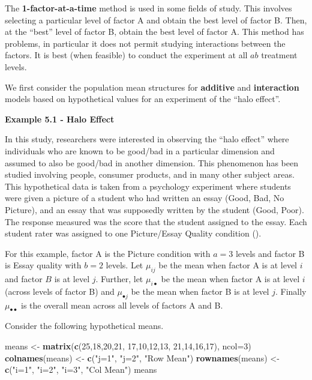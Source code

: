 \documentclass[
]{book}
\newenvironment{Shaded}{\begin{snugshade}}{\end{snugshade}}
\newcommand{\AttributeTok}[1]{\textcolor[rgb]{0.13,0.29,0.53}{#1}}
\newcommand{\DecValTok}[1]{\textcolor[rgb]{0.00,0.00,0.81}{#1}}
\newcommand{\FunctionTok}[1]{\textcolor[rgb]{0.13,0.29,0.53}{\textbf{#1}}}
\newcommand{\NormalTok}[1]{#1}
\newcommand{\OtherTok}[1]{\textcolor[rgb]{0.56,0.35,0.01}{#1}}
\newcommand{\StringTok}[1]{\textcolor[rgb]{0.31,0.60,0.02}{#1}}
\begin{document}
The \textbf{1-factor-at-a-time} method is used in some fields of study.
This involves selecting a particular level of factor A and obtain the
best level of factor B. Then, at the ``best'' level of factor B, obtain
the best level of factor A. This method has problems, in particular it
does not permit studying interactions between the factors. It is best
(when feasible) to conduct the experiment at all \(ab\) treatment
levels.

We first consider the population mean structures for \textbf{additive}
and \textbf{interaction} models based on hypothetical values for an
experiment of the ``halo effect''.

\textbf{Example 5.1 - Halo Effect}

In this study, researchers were interested in observing the ``halo
effect'' where individuals who are known to be good/bad in a particular
dimension and assumed to also be good/bad in another dimension. This
phenomenon has been studied involving people, consumer products, and in
many other subject areas. This hypothetical data is taken from a
psychology experiment where students were given a picture of a student
who had written an essay (Good, Bad, No Picture), and an essay that was
supposedly written by the student (Good, Poor). The response measured
was the score that the student assigned to the essay. Each student rater
was assigned to one Picture/Essay Quality condition
().

For this example, factor A is the Picture condition with \(a=3\) levels
and factor B is Essay quality with \(b=2\) levels. Let \(\mu_{ij}\) be
the mean when factor A is at level \(i\) and factor \(B\) is at level
\(j\). Further, let \(\mu_{i\bullet}\) be the mean when factor A is at
level \(i\) (across levels of factor B) and \(\mu_{\bullet j}\) be the
mean when factor B is at level \(j\). Finally \(\mu_{\bullet\bullet}\)
is the overall mean across all levels of factors A and B.

Consider the following hypothetical means.

\begin{Shaded}
\begin{Highlighting}[]
\NormalTok{means }\OtherTok{\textless{}{-}} \FunctionTok{matrix}\NormalTok{(}\FunctionTok{c}\NormalTok{(}\DecValTok{25}\NormalTok{,}\DecValTok{18}\NormalTok{,}\DecValTok{20}\NormalTok{,}\DecValTok{21}\NormalTok{, }\DecValTok{17}\NormalTok{,}\DecValTok{10}\NormalTok{,}\DecValTok{12}\NormalTok{,}\DecValTok{13}\NormalTok{, }\DecValTok{21}\NormalTok{,}\DecValTok{14}\NormalTok{,}\DecValTok{16}\NormalTok{,}\DecValTok{17}\NormalTok{), }\AttributeTok{ncol=}\DecValTok{3}\NormalTok{)}
\FunctionTok{colnames}\NormalTok{(means) }\OtherTok{\textless{}{-}} \FunctionTok{c}\NormalTok{(}\StringTok{"j=1"}\NormalTok{, }\StringTok{"j=2"}\NormalTok{, }\StringTok{"Row Mean"}\NormalTok{)}
\FunctionTok{rownames}\NormalTok{(means) }\OtherTok{\textless{}{-}} \FunctionTok{c}\NormalTok{(}\StringTok{"i=1"}\NormalTok{, }\StringTok{"i=2"}\NormalTok{, }\StringTok{"i=3"}\NormalTok{, }\StringTok{"Col Mean"}\NormalTok{)}
\NormalTok{means }
\end{Highlighting}
\end{Shaded}
\end{document}
